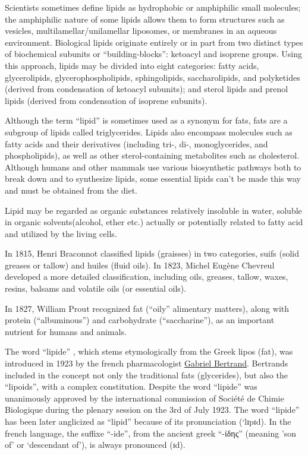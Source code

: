 Scientists sometimes define lipids as hydrophobic or amphiphilic small
molecules; the amphiphilic nature of some lipids allows them to form
structures such as vesicles, multilamellar/unilamellar liposomes, or
membranes in an aqueous environment. Biological lipids originate
entirely or in part from two distinct types of biochemical subunits or
``building-blocks'': ketoacyl and isoprene groups. Using this approach,
lipids may be divided into eight categories: fatty acids, glycerolipids,
glycerophospholipids, sphingolipids, saccharolipids, and polyketides
(derived from condensation of ketoacyl subunits); and sterol lipids and
prenol lipids (derived from condensation of isoprene subunits).

Although the term ``lipid'' is sometimes used as a synonym for fats,
fats are a subgroup of lipids called triglycerides. Lipids also
encompass molecules such as fatty acids and their derivatives (including
tri-, di-, monoglycerides, and phospholipids), as well as other
sterol-containing metabolites such as cholesterol. Although humans and
other mammals use various biosynthetic pathways both to break down and
to synthesize lipids, some essential lipids can't be made this way and
must be obtained from the diet.

Lipid may be regarded as organic substances relatively insoluble in
water, soluble in organic solvents(alcohol, ether etc.) actually or
potentially related to fatty acid and utilized by the living cells.

In 1815, Henri Braconnot classified lipids (graisses) in two categories,
suifs (solid greases or tallow) and huiles (fluid oils). In 1823, Michel
Eugène Chevreul developed a more detailed classification, including
oils, greases, tallow, waxes, resins, balsams and volatile oils (or
essential oils).

In 1827, William Prout recognized fat (``oily'' alimentary matters),
along with protein (``albuminous'') and carbohydrate (``saccharine''),
as an important nutrient for humans and animals.

The word ``lipide'' , which stems etymologically from the Greek lipos
(fat), was introduced in 1923 by the french pharmacologist
\href{https://en.wikipedia.org/wiki/Gabriel_Bertrand}{Gabriel Bertrand}.
Bertrands included in the concept not only the traditional fats
(glycerides), but also the ``lipoids'', with a complex constitution.
Despite the word ``lipide'' was unanimously approved by the
international commission of Société de Chimie Biologique during the
plenary session on the 3rd of July 1923. The word ``lipide'' has been
later anglicized as ``lipid'' because of its pronunciation (`lɪpɪd). In
the french language, the suffixe ``-ide'', from the ancient greek
``-ίδης'' (meaning 'son of' or `descendant of'), is always pronounced
(ɪd).

